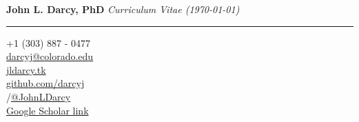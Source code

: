 \documentclass{article}
\begin{document}
{\Huge \textbf{John L. Darcy, PhD}}
\hfill
\emph{Curriculum Vitae (\today)}
\vspace{1mm}
\hrule
\vspace{2mm}

\begin{adjustwidth}{5mm}{}
  \begin{multicols}{3}
    \faPhone \space +1 (303) 887 - 0477\\
    \faEnvelope \space \href{mailto:darcyj@colorado.edu}{darcyj@colorado.edu}\\
    \faGlobe \space \href{http://www.jldarcy.tk/}{jldarcy.tk}\\
    \faGithub \space \href{https://github.com/darcyj}{github.com/darcyj}\\
    \faInstagram/\faTwitter \space \href{https://www.instagram.com/jld.adventures/}{@JohnLDarcy}\\
    \faMortarBoard \space \href{https://scholar.google.com/citations?user=z24F3PYAAAAJ}{Google Scholar link}
  \end{multicols}
\end{adjustwidth}
\end{document}
